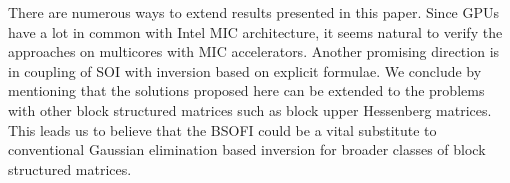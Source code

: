 \documentclass{llncs}
\begin{document}
There are numerous ways to extend results presented in this paper.
Since GPUs have a lot in common with Intel MIC architecture, 
it seems natural to verify the approaches
on multicores with MIC accelerators.
%
Another promising direction is in coupling of 
SOI with inversion based on explicit formulae. 
%
We conclude by mentioning 
that the solutions proposed here can be extended to 
the problems with other block structured matrices such as
block upper Hessenberg matrices. 
This leads us to believe that the BSOFI could be a vital substitute 
to conventional Gaussian elimination based inversion
for broader classes of block structured matrices.



\end{document}
